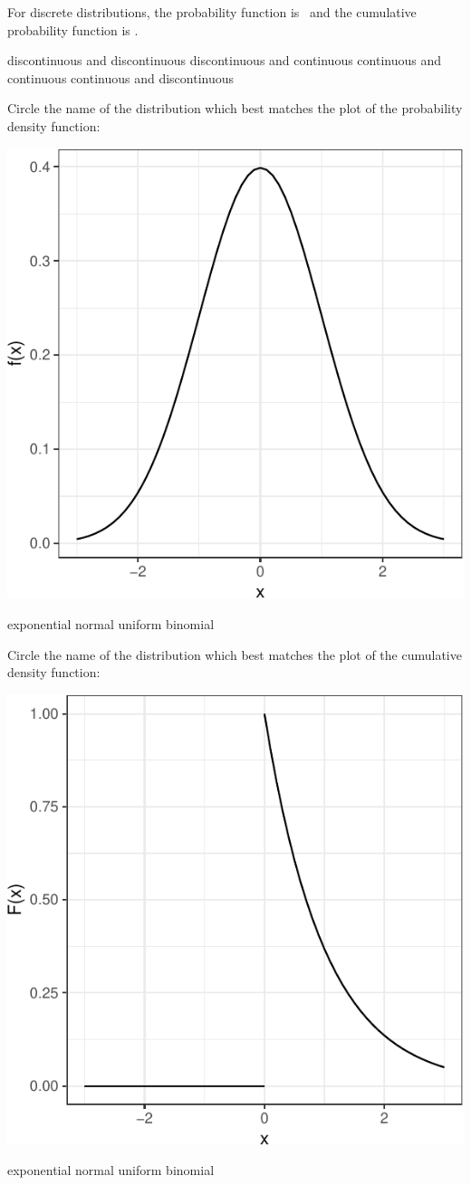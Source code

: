 \documentclass[fleqn,answers,addpoints]{exam}
\begin{document}
\begin{questions}

\question[2] For discrete distributions, the probability function is
\fillin~and the cumulative probability function is \fillin.

\begin{oneparchoices}
\choice discontinuous and discontinuous
\choice discontinuous and continuous
\choice continuous and continuous
\choice continuous and discontinuous
\end{oneparchoices}
\vspace{1cm}

\question[3]Circle the name of the distribution which best matches the
plot of the probability density function:

\begin{center}\includegraphics[width=.4\linewidth,height=.4\linewidth]{stat305-exam2_files/figure-latex/unnamed-chunk-2-1} \end{center}
\begin{oneparchoices}
\choice exponential 
\choice normal 
\choice uniform
\choice binomial
\end{oneparchoices}
\vspace{1cm}

\question[3]Circle the name of the distribution which best matches the
plot of the cumulative density function:

\begin{center}\includegraphics[width=.4\linewidth,height=.4\linewidth]{stat305-exam2_files/figure-latex/unnamed-chunk-3-1} \end{center}
\begin{oneparchoices}
\choice exponential 
\choice normal 
\choice uniform
\choice binomial
\end{oneparchoices}


\end{questions}
\end{document}
